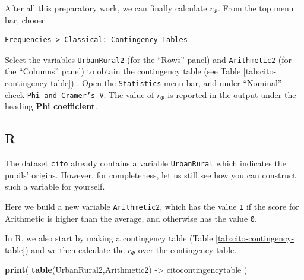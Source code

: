 \documentclass[
]{book}
\newenvironment{Shaded}{\begin{snugshade}}{\end{snugshade}}
\newcommand{\CommentTok}[1]{\textcolor[rgb]{0.56,0.35,0.01}{\textit{#1}}}
\newcommand{\DecValTok}[1]{\textcolor[rgb]{0.00,0.00,0.81}{#1}}
\newcommand{\KeywordTok}[1]{\textcolor[rgb]{0.13,0.29,0.53}{\textbf{#1}}}
\newcommand{\NormalTok}[1]{#1}
\newcommand{\OperatorTok}[1]{\textcolor[rgb]{0.81,0.36,0.00}{\textbf{#1}}}
\newcommand{\StringTok}[1]{\textcolor[rgb]{0.31,0.60,0.02}{#1}}
\begin{document}
After all this preparatory work, we can finally calculate \(r_\Phi\). From the top menu bar, choose

\begin{verbatim}
Frequencies > Classical: Contingency Tables
\end{verbatim}

Select the variables \texttt{UrbanRural2} (for the ``Rows'' panel) and \texttt{Arithmetic2} (for the ``Columns'' panel) to obtain the contingency table (see Table \ref{tab:cito-contingency-table}) .
Open the \texttt{Statistics} menu bar, and under ``Nominal'' check \texttt{Phi\ and\ Cramer’s\ V}.
The value of \(r_\Phi\) is reported in the output under the heading \textbf{Phi coefficient}.

\hypertarget{r-9}{%
\subsection{R}\label{r-9}}

The dataset \texttt{cito} already contains a variable \texttt{UrbanRural} which indicates the pupils' origins.
However, for completeness, let us still see how you can construct such a variable for yourself.

\begin{Shaded}
\end{Shaded}

Here we build a new variable \texttt{Arithmetic2}, which has the value \texttt{1} if the score for
Arithmetic is higher than the average, and otherwise has the value \texttt{0}.

In R, we also start by making a contingency table (Table \ref{tab:cito-contingency-table}) and we then calculate the \(r_\Phi\) over the contingency table.

\begin{Shaded}
\begin{Highlighting}[]
\KeywordTok{print}\NormalTok{( }\KeywordTok{table}\NormalTok{(UrbanRural2,Arithmetic2) {-}\textgreater{}}\StringTok{ }\NormalTok{citocontingencytable ) }
\end{Highlighting}
\end{Shaded}
\end{document}
